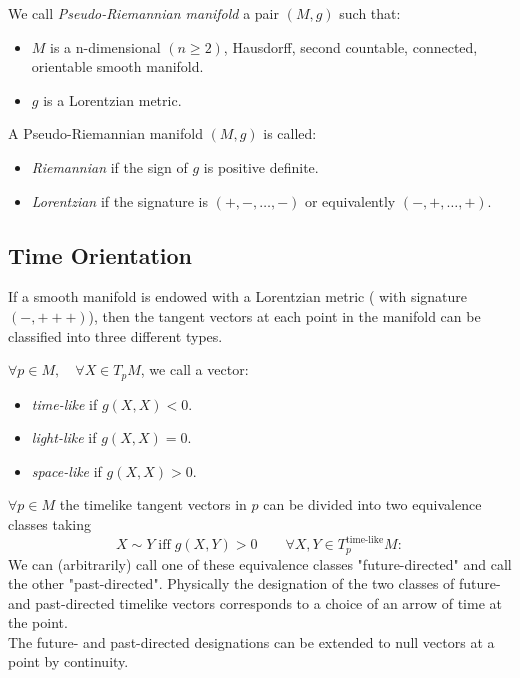 \documentclass[Main]{subfiles}
\begin{document}
			\begin{definition}
				We call \emph{Pseudo-Riemannian manifold} a pair $(M, g)$ such that:
				\begin{itemize}
					\item $M$ is a n-dimensional $(n\geq2)$, Hausdorff, second countable, connected, orientable smooth manifold.
					\item $g$ is a Lorentzian metric.
				\end{itemize}
			\end{definition}		
				A Pseudo-Riemannian manifold $(M,g)$ is called:
				 \begin{itemize}
				 	\item \emph{Riemannian} if the sign of $g$ is positive definite.%
				 	\item \emph{Lorentzian} if the signature is $(+, -, \ldots,- )$ or equivalently $(-,+,\ldots,+)$.
				 \end{itemize}
		
		\subsection{Time Orientation}
			If a smooth manifold is endowed with a Lorentzian metric ( with signature $(-,+++)$), then the tangent vectors at each point in the manifold can be classified into three different types. 
			\begin{notationfix}

				$\forall p \in M, \quad \forall X \in T_pM$,  we call a vector:
				\begin{itemize}
					\item \emph{time-like} if $g(X,X)<0$.
					\item \emph{light-like} if $g(X,X)=0$.
					\item \emph{space-like} if $g(X,X)>0$.
				\end{itemize}
			\end{notationfix}
		
			\begin{observation}
				$\forall p\in M$ the timelike tangent vectors in $p$ can be divided into two equivalence classes taking
				\begin{displaymath}
					X \sim Y \; \textrm{iff} \; g(X,Y)>0 \qquad \forall X,Y \in T^\textrm{time-like}_pM:
				\end{displaymath}
				We can (arbitrarily) call one of these equivalence classes "future-directed" and call the other "past-directed". Physically the designation of the two classes of future- and past-directed timelike vectors corresponds to a choice of an arrow of time at the point.
				\\
				The future- and past-directed designations can be extended to null vectors at a point by continuity.
			\end{observation}
	
\end{document}
